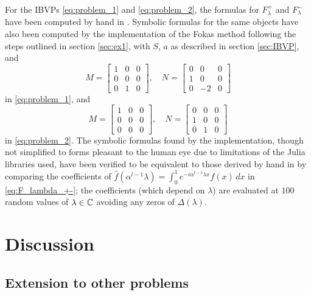 \documentclass[12pt, oneside, a4paper]{article}
\begin{document}
For the IBVPs \eqref{eq:problem_1} and \eqref{eq:problem_2}, the formulas for $F_\lambda^+$ and $F_\lambda^-$ have been computed by hand in \cite[p. 1-4]{Smith2016}. Symbolic formulas for the same objects have also been computed by the implementation of the Fokas method following the steps outlined in section \ref{sec:ex1}, with $S$, $a$ as described in section \ref{sec:IBVP}, and
\[M = \begin{bmatrix}1 & 0 & 0\\ 0 & 0 & 0\\ 0 & 1 & 0\end{bmatrix},\quad N = \begin{bmatrix} 0 & 0 & 0\\ 1 & 0 & 0 \\ 0 & -2 & 0\end{bmatrix}\]
in \eqref{eq:problem_1}, and 
\[M = \begin{bmatrix}1 & 0 & 0\\ 0 & 0 & 0\\ 0 & 0 & 0\end{bmatrix},\quad N = \begin{bmatrix} 0 & 0 & 0\\ 1 & 0 & 0 \\ 0 & 1 & 0\end{bmatrix}\]
in \eqref{eq:problem_2}. The symbolic formulas found by the implementation, though not simplified to forms pleasant to the human eye due to limitations of the Julia libraries used, have been verified to be equivalent to those derived by hand in \cite{Smith2016} by comparing the coefficients of $\hat{f}(\alpha^{l-1}\lambda) = \int_0^1 e^{-i\alpha^{l-1}\lambda x}f(x)\,dx$ in \eqref{eq:F_lambda_+-}; the coefficients (which depend on $\lambda$) are evaluated at $100$ random values of $\lambda\in\mathbb C$ avoiding any zeros of $\Delta(\lambda)$.

\section{Discussion}\label{sec:discussion}

\subsection{Extension to other problems}
\end{document}
